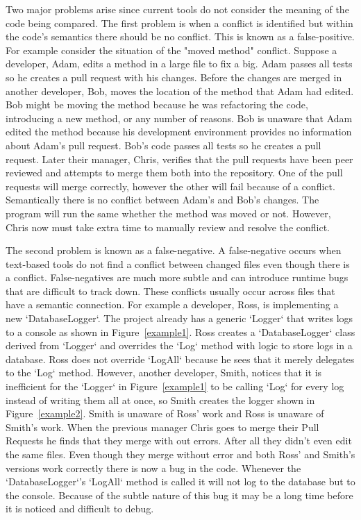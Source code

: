 \documentclass[draftclsnofoot,onecolumn]{IEEEtran}
\begin{document}
Two major problems arise since current tools do not consider the meaning of the 
code being compared. The first problem is when a conflict is identified but 
within the code's semantics there should be no conflict. This is known as a 
false-positive. For example consider the situation of the "moved method" 
conflict. Suppose a developer, Adam, edits a method in a large file to fix a 
big. Adam passes all tests so he creates a pull request with his changes. 
Before the changes are merged in another developer, Bob, moves the location of 
the method that Adam had edited. Bob might be moving the method because he was 
refactoring the code, introducing a new method, or any number of reasons. Bob 
is unaware that Adam edited the method because his development environment 
provides no information about Adam's pull request. Bob's code passes all tests 
so he creates a pull request. Later their manager, Chris, verifies that the 
pull requests have been peer reviewed and attempts to merge them both into the 
repository. One of the pull requests will merge correctly, however the other 
will fail because of a conflict. Semantically there is no conflict between 
Adam's and Bob's changes. The program will run the same whether the method was 
moved or not. However, Chris now must take extra time to manually review and 
resolve the conflict.

The second problem is known as a false-negative. A false-negative occurs when 
text-based tools do not find a conflict between changed files even though there 
is a conflict. False-negatives are much more subtle and can introduce runtime 
bugs that are difficult to track down. These conflicts usually occur across 
files that have a semantic connection. For example a developer, Ross, is 
implementing a new `DatabaseLogger`. The project already has a generic `Logger` 
that writes logs to a console as shown in Figure~\ref{example1}. Ross creates a 
`DatabaseLogger` class derived from `Logger` and overrides the `Log` method 
with logic to store logs in a database. Ross does not override `LogAll` because 
he sees that it merely delegates to the `Log` method. However, another 
developer, Smith, notices that it is inefficient for the `Logger` in 
Figure~\ref{example1} to be calling `Log` for every log instead of writing them 
all at once, so Smith creates the logger shown in Figure~\ref{example2}. Smith 
is unaware of Ross' work and Ross is unaware of Smith's work. When the previous 
manager Chris goes to merge their Pull Requests he finds that they merge with 
out errors. After all they didn't even edit the same files. Even though they 
merge without error and both Ross' and Smith's versions work correctly there is 
now a bug in the code. Whenever the `DatabaseLogger`’s `LogAll` method is 
called it will not log to the database but to the console. Because of the 
subtle nature of this bug it may be a long time before it is noticed and 
difficult to debug.
\end{document}
